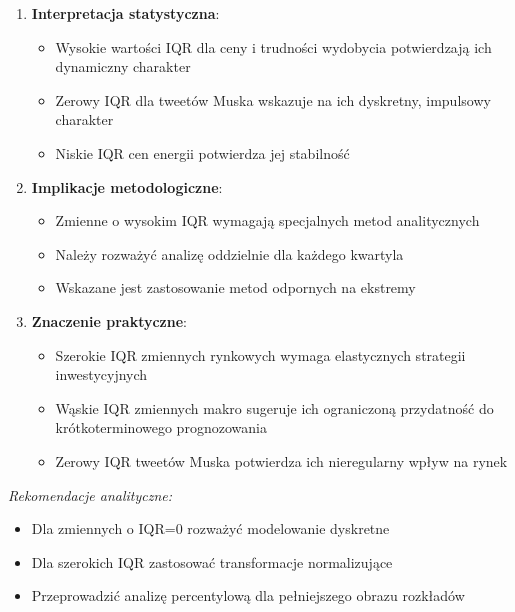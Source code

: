 \documentclass[
  11pt,
]{article}
\providecommand{\tightlist}{%
  \setlength{\itemsep}{0pt}\setlength{\parskip}{0pt}}
\begin{document}
\begin{enumerate}
\def\labelenumi{\arabic{enumi}.}
\tightlist
\item
  \textbf{Interpretacja statystyczna}: \vspace{0.2cm}

  \begin{itemize}
  \tightlist
  \item
    Wysokie wartości IQR dla ceny i trudności wydobycia potwierdzają ich
    dynamiczny charakter
  \item
    Zerowy IQR dla tweetów Muska wskazuje na ich dyskretny, impulsowy
    charakter
  \item
    Niskie IQR cen energii potwierdza jej stabilność
  \end{itemize}
\item
  \textbf{Implikacje metodologiczne}: \vspace{0.2cm}

  \begin{itemize}
  \tightlist
  \item
    Zmienne o wysokim IQR wymagają specjalnych metod analitycznych
  \item
    Należy rozważyć analizę oddzielnie dla każdego kwartyla
  \item
    Wskazane jest zastosowanie metod odpornych na ekstremy
  \end{itemize}
\item
  \textbf{Znaczenie praktyczne}: \vspace{0.2cm}

  \begin{itemize}
  \tightlist
  \item
    Szerokie IQR zmiennych rynkowych wymaga elastycznych strategii
    inwestycyjnych
  \item
    Wąskie IQR zmiennych makro sugeruje ich ograniczoną przydatność do
    krótkoterminowego prognozowania
  \item
    Zerowy IQR tweetów Muska potwierdza ich nieregularny wpływ na rynek
  \end{itemize}
\end{enumerate}

\vspace{0.3cm}

\textit{Rekomendacje analityczne:}

\begin{itemize}
\item Dla zmiennych o IQR=0 rozważyć modelowanie dyskretne
\item Dla szerokich IQR zastosować transformacje normalizujące
\item Przeprowadzić analizę percentylową dla pełniejszego obrazu rozkładów
\end{itemize}
\end{document}
